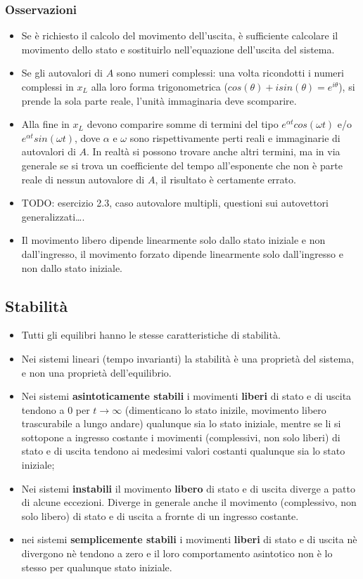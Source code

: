 \begin{landscape}
    \subsubsection*{Osservazioni}
    \begin{itemize}
        \item Se è richiesto il calcolo del movimento dell'uscita, è sufficiente calcolare il movimento dello stato e sostituirlo nell'equazione dell'uscita del sistema.
        \item Se gli autovalori di $A$ sono numeri complessi: una volta ricondotti i numeri complessi in $x_L$ alla loro forma trigonometrica ($cos(\theta) + i sin(\theta) = e^{i \theta}$), si prende la sola parte reale, l'unità immaginaria deve scomparire.
        \item Alla fine in $x_L$ devono comparire somme di termini del tipo $e^{\alpha t} cos(\omega t)$ e/o $e^{\alpha t} sin(\omega t)$, dove $\alpha$ e $\omega$ sono rispettivamente perti reali e immaginarie di autovalori di $A$. In realtà si possono trovare anche altri termini, ma in via generale se si trova un coefficiente del tempo all'esponente che non è parte reale di nessun autovalore di $A$, il risultato è certamente errato.
        \item TODO: esercizio 2.3, caso autovalore multipli, questioni sui autovettori generalizzati\dots.
        \item Il movimento libero dipende linearmente solo dallo stato iniziale e non dall’ingresso, il movimento forzato dipende linearmente solo dall’ingresso e non dallo stato iniziale.
    \end{itemize}
    \subsection*{Stabilità}
    \begin{itemize}
        \item Tutti gli equilibri hanno le stesse caratteristiche di stabilità.
        \item Nei sistemi lineari (tempo invarianti) la stabilità è una proprietà del sistema, e non una proprietà dell’equilibrio. 
        \item Nei sistemi \textbf{asintoticamente stabili} i movimenti \textbf{liberi} di stato e di uscita tendono a $0$ per $t \rightarrow \infty$ (dimenticano lo stato inizile, movimento libero trascurabile a lungo andare) qualunque sia lo stato iniziale, mentre se li si sottopone a ingresso costante i movimenti (complessivi, non solo liberi) di stato e di uscita tendono ai medesimi valori costanti qualunque sia lo stato iniziale;
        \item Nei sistemi \textbf{instabili} il movimento \textbf{libero} di stato e di uscita diverge a patto di alcune eccezioni. Diverge in generale anche il movimento (complessivo, non solo libero) di stato e di uscita a frornte di un ingresso costante.
        \item nei sistemi \textbf{semplicemente stabili} i movimenti \textbf{liberi} di stato e di uscita nè divergono nè tendono a zero e il loro comportamento asintotico non è lo stesso per qualunque stato iniziale.
    \end{itemize}

\end{landscape}
